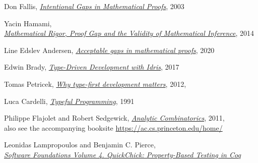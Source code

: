 \documentclass[declaration,mgr,english,shortabstract]{iithesis}
\begin{document}
\begin{thebibliography}{1}
    Don Fallis,
    \href{https://www.jstor.org/stable/20117325?seq=1}{\textit{Intentional Gaps in Mathematical Proofs}}, 2003

    Yacin Hamami, \\
    \href{https://journals.openedition.org/philosophiascientiae/908}{\textit{Mathematical Rigor, Proof Gap and the Validity of Mathematical Inference}}, 2014

    Line Edslev Andersen,
    \href{https://link.springer.com/article/10.1007/s11229-018-1778-8}{\textit{Acceptable gaps in mathematical proofs}}, 2020

    Edwin Brady,
    \href{https://www.manning.com/books/type-driven-development-with-idris}{\textit{Type-Driven Development with Idris}},
    2017

    Tomas Petricek,
    \href{http://tomasp.net/blog/type-first-development.aspx/}{\textit{Why type-first development matters}}, 2012, \\

    Luca Cardelli,
    \href{http://www.lucacardelli.name/Papers/TypefulProg.pdf}{\textit{Typeful Programming}}, 1991

    Philippe Flajolet and Robert Sedgewick,
    \href{https://ac.cs.princeton.edu/home/AC.pdf}{\textit{Analytic Combinatorics}}, 2011, \\
    also see the accompanying booksite \url{https://ac.cs.princeton.edu/home/}

    Leonidas Lampropoulos and Benjamin C. Pierce, \\
    \href{https://softwarefoundations.cis.upenn.edu/qc-current/Preface.html}{\textit{Software Foundations Volume 4. QuickChick: Property-Based Testing in Coq}}

\end{thebibliography}
\end{document}
